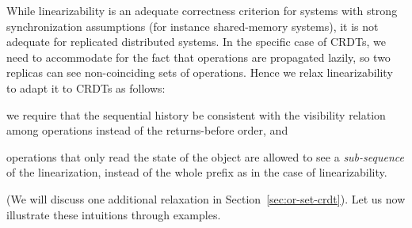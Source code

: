 While linearizability is an adequate correctness criterion for
systems with strong synchronization assumptions (for instance
shared-memory systems), it is not adequate for replicated distributed
systems.
%
In the specific case of CRDTs, we need to accommodate for the fact
that operations are propagated lazily, so two replicas can see
non-coinciding sets of operations.
%
Hence we relax linearizability to adapt it to CRDTs as follows:
\begin{inparaenum}
\item we require that the sequential history be consistent with
the visibility relation among operations instead of the returns-before order, and
\item operations that only read the state of the object are allowed
to see a \emph{sub-sequence} of the linearization, instead of
the whole prefix as in the case of linearizability.
\end{inparaenum}
(We will discuss one additional relaxation in Section~\ref{sec:or-set-crdt}).
%
%
Let us now illustrate these intuitions through examples.


